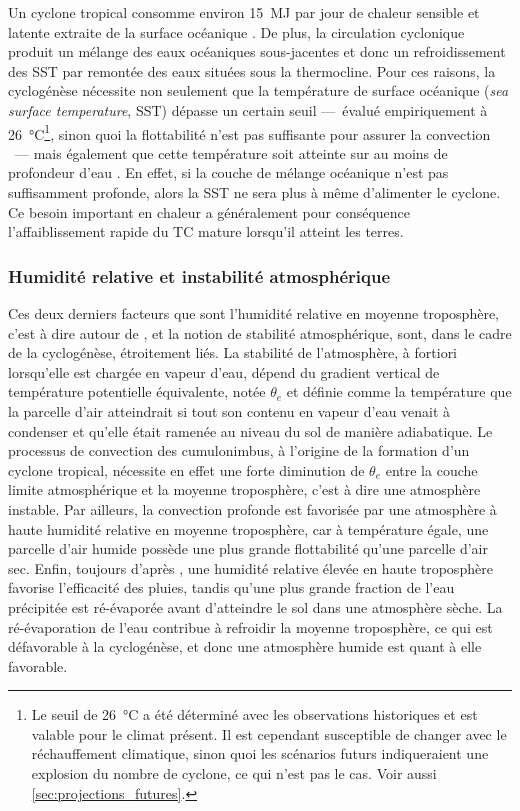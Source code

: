 \documentclass[../main.tex]{subfiles}
\begin{document}
Un cyclone tropical consomme environ \SI{15}{\mega\joule} par jour de chaleur sensible et latente extraite de la surface océanique
\parencite{gray_tropical_1975}. De plus, la circulation cyclonique produit un mélange des eaux océaniques sous-jacentes et donc un refroidissement des SST par
remontée des eaux situées sous la thermocline. Pour ces raisons, la cyclogénèse nécessite non seulement que la température de surface océanique (\textit{sea
surface temperature}, SST) dépasse un certain seuil ---~évalué empiriquement à \SI{26}{\degreeCelsius}\footnote{Le seuil de \SI{26}{\degreeCelsius} a été
déterminé avec les observations historiques et est valable pour le climat présent. Il est cependant susceptible de changer avec le réchauffement climatique,
sinon quoi les scénarios futurs indiqueraient une explosion du nombre de cyclone, ce qui n'est pas le cas. Voir aussi \cref{sec:projections_futures}.}, sinon
quoi la flottabilité n'est pas suffisante pour assurer la convection \parencite{palmen_formation_1948}~--- mais également que cette température soit atteinte
sur au moins  de profondeur d'eau \parencite{leipper_observed_1967,perlboth_hurricane_1967}. En effet, si la couche de mélange océanique n'est pas
suffisamment profonde, alors la SST ne sera plus à même d'alimenter le cyclone. Ce besoin important en chaleur a généralement pour conséquence l'affaiblissement
rapide du TC mature lorsqu'il atteint les terres.

\subsubsection*{Humidité relative et instabilité atmosphérique}

Ces deux derniers facteurs que sont l'humidité relative en moyenne troposphère, c'est à dire autour de , et la notion de stabilité atmosphérique, sont,
dans le cadre de la cyclogénèse, étroitement liés. La stabilité de l'atmosphère, à fortiori lorsqu'elle est chargée en vapeur d'eau, dépend du gradient vertical
de température potentielle équivalente, notée $\theta_e$ et définie comme la température que la parcelle d'air atteindrait si tout son contenu en vapeur d'eau
venait à condenser et qu'elle était ramenée au niveau du sol de manière adiabatique. Le processus de convection des cumulonimbus, à l'origine de la formation
d'un cyclone tropical, nécessite en effet une forte diminution de $\theta_e$ entre la couche limite atmosphérique et la moyenne troposphère, c'est à dire une
atmosphère instable. Par ailleurs, la convection profonde est favorisée par une atmosphère à haute humidité relative en moyenne troposphère, car à température
égale, une parcelle d'air humide possède une plus grande flottabilité qu'une parcelle d'air sec. Enfin, toujours d'après \textcite{gray_tropical_1975}, une humidité
relative élevée en haute troposphère favorise l'efficacité des pluies, tandis qu'une plus grande fraction de l'eau précipitée est ré-évaporée avant d'atteindre
le sol dans une atmosphère sèche. La ré-évaporation de l'eau contribue à refroidir la moyenne troposphère, ce qui est défavorable à la cyclogénèse, et donc une
atmosphère humide est quant à elle favorable.
\end{document}
